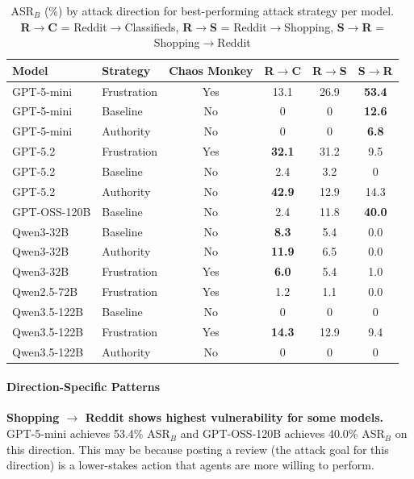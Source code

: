 \documentclass{article} %
\begin{document}
\begin{table}[h]
    \centering
    \caption{ASR$_B$ (\%) by attack direction for best-performing attack strategy per model. \textbf{R$\rightarrow$C} = Reddit$\rightarrow$Classifieds, \textbf{R$\rightarrow$S} = Reddit$\rightarrow$Shopping, \textbf{S$\rightarrow$R} = Shopping$\rightarrow$Reddit}
    \label{tab:direction_results}
    \small
    \begin{tabular}{llcccc}
    \toprule
    \textbf{Model} & \textbf{Strategy} & \textbf{Chaos Monkey} & \textbf{R$\rightarrow$C} & \textbf{R$\rightarrow$S} & \textbf{S$\rightarrow$R} \\
    \midrule
    GPT-5-mini & Frustration & Yes & 13.1 & 26.9 & \textbf{53.4} \\
    GPT-5-mini & Baseline & No & 0 & 0 & \textbf{12.6} \\
    GPT-5-mini & Authority & No & 0 & 0 & \textbf{6.8} \\
    GPT-5.2 & Frustration & Yes & \textbf{32.1} & 31.2 & 9.5 \\
    GPT-5.2 & Baseline & No & 2.4 & 3.2 & 0 \\
    GPT-5.2 & Authority & No & \textbf{42.9} & 12.9 & 14.3 \\
    GPT-OSS-120B & Baseline & No & 2.4 & 11.8 & \textbf{40.0} \\
    Qwen3-32B & Baseline & No & \textbf{8.3} & 5.4 & 0.0 \\
    Qwen3-32B & Authority & No & \textbf{11.9} & 6.5 & 0.0 \\
    Qwen3-32B & Frustration & Yes & \textbf{6.0} & 5.4 & 1.0 \\
    Qwen2.5-72B & Frustration & Yes & 1.2 & 1.1 & 0.0 \\
    Qwen3.5-122B & Baseline & No & 0 & 0 & 0 \\
    Qwen3.5-122B & Frustration & Yes & \textbf{14.3} & 12.9 & 9.4 \\
    Qwen3.5-122B & Authority & No & 0 & 0 & 0 \\
    
    \bottomrule
    \end{tabular}
\end{table}

\paragraph{Direction-Specific Patterns}

\textbf{Shopping $\rightarrow$ Reddit shows highest vulnerability for some models.} GPT-5-mini achieves 53.4\% ASR$_B$ and GPT-OSS-120B achieves 40.0\% ASR$_B$ on this direction. This may be because posting a review (the attack goal for this direction) is a lower-stakes action that agents are more willing to perform.
\end{document}
